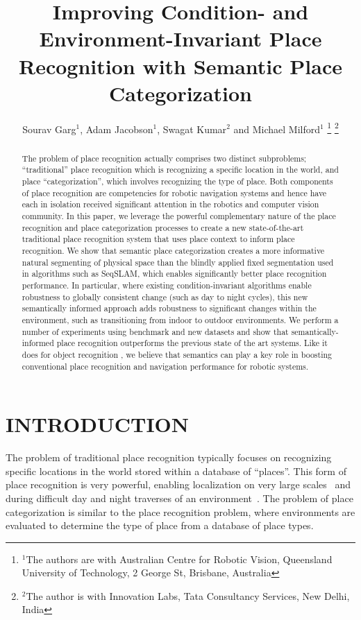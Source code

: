 \documentclass[letterpaper, 10 pt, conference]{ieeeconf}  %
\title{\LARGE \bf
Improving Condition- and Environment-Invariant Place Recognition with Semantic Place Categorization
}
\author{Sourav Garg$^{1}$, Adam Jacobson$^{1}$, Swagat Kumar$^{2}$ and Michael Milford$^{1}$%
\thanks{$^{1}$The authors are with Australian Centre for Robotic Vision,
        Queensland University of Technology,
        2 George St, Brisbane, Australia}%
\thanks{$^{2}$The author is with Innovation Labs, Tata Consultancy Services,
        New Delhi, India}%
}
\begin{document}
\maketitle
\thispagestyle{empty}
\pagestyle{empty}


\begin{abstract}
The problem of place recognition actually comprises two distinct subproblems; ``traditional'' place recognition which is recognizing a specific location in the world, and place ``categorization'', which involves recognizing the type of place. Both components of place recognition are competencies for robotic navigation systems and hence have each in isolation received significant attention in the robotics and computer vision community. In this paper, we leverage the powerful complementary nature of the place recognition and place categorization processes to create a new state-of-the-art traditional place recognition system that uses place context to inform place recognition. We show that semantic place categorization creates a more informative natural segmenting of physical space than the blindly applied fixed segmentation used in algorithms such as SeqSLAM, which enables significantly better place recognition performance. In particular, where existing condition-invariant algorithms enable robustness to globally consistent change (such as day to night cycles), this new semantically informed approach adds robustness to significant changes within the environment, such as transitioning from indoor to outdoor environments. We perform a number of experiments using benchmark and new datasets and show that semantically-informed place recognition outperforms the previous state of the art systems. Like it does for object recognition \cite{sunderhauf2016place}, we believe that  semantics can play a key role in boosting conventional place recognition and navigation performance for robotic systems.
\end{abstract}

\section{INTRODUCTION}


The problem of traditional place recognition typically focuses on recognizing specific locations in the world stored within a database of ``places''. This form of place recognition is very powerful, enabling localization on very large scales~\cite{Cummins2009} and during difficult day and night traverses of an environment~\cite{Milford2012}. The problem of place categorization is similar to the place recognition problem, where environments are evaluated to determine the type of place from a database of place types. 
\end{document}
